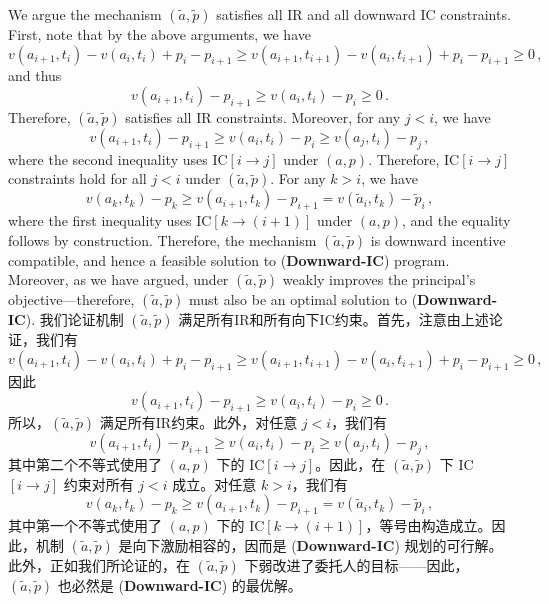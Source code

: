 \documentclass[12pt,letterpaper]{article}
\newenvironment{original}{\color{black}\noindent}{}
\newenvironment{translation}{\color{blue}\noindent}{}
\theoremstyle{plain}
\theoremstyle{definition}
\theoremstyle{remark}
\renewcommand{\1}{\mathds{1}}
\theoremstyle{definition}
\begin{document}
\begin{original}
We argue the mechanism $(\tilde{a}, \tilde{p})$ satisfies all IR and all downward IC constraints. First, note that by the above arguments, we have
\[v(a_{i+1}, t_{i}) - v(a_{i}, t_{i}) + p_i - p_{i+1} \geq v(a_{i+1}, t_{i+1}) - v(a_{i}, t_{i+1}) + p_i - p_{i+1} \geq 0\,, \]
and thus
\[v(a_{i+1}, t_{i}) - p_{i+1} \geq v(a_{i}, t_{i}) - p_i \geq 0\,. \]
Therefore, $(\tilde{a}, \tilde{p})$ satisfies all IR constraints. Moreover, for any $j < i$, we have
\[v(a_{i+1}, t_{i}) - p_{i+1} \geq v(a_{i}, t_{i}) - p_i \geq v(a_{j}, t_{i}) - p_j \,, \]
where the second inequality uses IC$[i \rightarrow j]$ under $(a, p)$. Therefore, IC$[i \rightarrow j]$ constraints hold for all $j < i$ under $(\tilde{a}, \tilde{p})$. For any $k > i$, we have
\[v(a_{k}, t_{k}) - p_{k} \geq v(a_{i+1}, t_{k}) - p_{i+1} = v(\tilde{a}_{i}, t_{k}) - \tilde{p}_{i} \,, \]
where the first inequality uses IC$[k \rightarrow (i+1)]$ under $(a, p)$, and the equality follows by construction. Therefore, the mechanism $(\tilde{a}, \tilde{p})$ is downward incentive compatible, and hence a feasible solution to (\textbf{Downward-IC}) program. Moreover, as we have argued, under $(\tilde{a}, \tilde{p})$ weakly improves the principal's objective---therefore, $(\tilde{a}, \tilde{p})$ must also be an optimal solution to (\textbf{Downward-IC}).
\end{original}
\begin{translation}
我们论证机制 $(\tilde{a}, \tilde{p})$ 满足所有IR和所有向下IC约束。首先，注意由上述论证，我们有
\[v(a_{i+1}, t_{i}) - v(a_{i}, t_{i}) + p_i - p_{i+1} \geq v(a_{i+1}, t_{i+1}) - v(a_{i}, t_{i+1}) + p_i - p_{i+1} \geq 0\,, \]
因此
\[v(a_{i+1}, t_{i}) - p_{i+1} \geq v(a_{i}, t_{i}) - p_i \geq 0\,. \]
所以，$(\tilde{a}, \tilde{p})$ 满足所有IR约束。此外，对任意 $j < i$，我们有
\[v(a_{i+1}, t_{i}) - p_{i+1} \geq v(a_{i}, t_{i}) - p_i \geq v(a_{j}, t_{i}) - p_j \,, \]
其中第二个不等式使用了 $(a, p)$ 下的 IC$[i \rightarrow j]$。因此，在 $(\tilde{a}, \tilde{p})$ 下 IC$[i \rightarrow j]$ 约束对所有 $j < i$ 成立。对任意 $k > i$，我们有
\[v(a_{k}, t_{k}) - p_{k} \geq v(a_{i+1}, t_{k}) - p_{i+1} = v(\tilde{a}_{i}, t_{k}) - \tilde{p}_{i} \,, \]
其中第一个不等式使用了 $(a, p)$ 下的 IC$[k \rightarrow (i+1)]$，等号由构造成立。因此，机制 $(\tilde{a}, \tilde{p})$ 是向下激励相容的，因而是 (\textbf{Downward-IC}) 规划的可行解。此外，正如我们所论证的，在 $(\tilde{a}, \tilde{p})$ 下弱改进了委托人的目标——因此，$(\tilde{a}, \tilde{p})$ 也必然是 (\textbf{Downward-IC}) 的最优解。
\end{translation}
\end{document}
